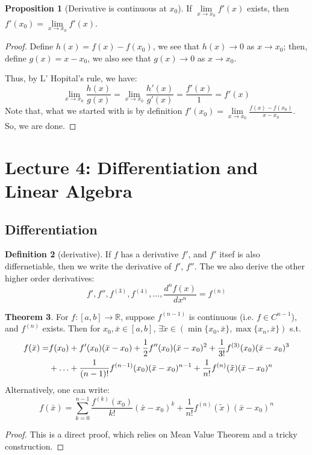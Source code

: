 \documentclass[12pt]{article}
\newcommand{\R}{{\mathbb R}}
\theoremstyle{definition}
\newtheorem{theorem}{Theorem}[section]
\newtheorem{definition}[theorem]{Definition}
\newtheorem{proposition}[theorem]{Proposition}
\theoremstyle{plain}
\begin{document}
\begin{proposition}
    [Derivative is continuous at $x_0$]
    If $\underset{x \to x_0} \lim f'(x)$ exists, then $f'(x_0) = \underset{x \to
    x_0} \lim
    f'(x)$.

    \begin{proof}
        Define $h(x) = f(x) - f(x_0)$, we see that $h(x) \to 0$ as $x \to x_0$;
        then, define $g(x) = x - x_0$, we also see that $g(x) \to 0$ as $x \to
        x_0$.

        Thus, by L' Hopital's rule, we have:
        \[
            \underset{x \to x_0} \lim \frac{h(x)}{g(x)} = \underset{x \to x_0}
            \lim
            \frac{h'(x)}{g'(x)} = \frac{f'(x)}{ 1} = f'(x)
        \]
        Note that, what we started with is by definition $f'(x_0) = \underset{x
        \to x_0} \lim \frac{f(x) - f(x_0)}{ x - x_0}$. So, we are done.
    \end{proof}
\end{proposition}

\section{Lecture 4: Differentiation and Linear Algebra}

\subsection{Differentiation}

\begin{definition}
    [derivative]
    If $f$ has a derivative $f'$, and $f'$ itsef is also differnetiable, then we
    write the derivative of $f'$, $f''$. The we also derive the other higher
    order derivatives:
    \[
        f', f'', f^{(3)}, f^{(4)}, \ldots, \frac{d ^n f(x)}{d x^n} = f^{(n)}
    \]
\end{definition}

\begin{theorem}
    For $f:[a,b] \to \R$, suppose $f^{(n-1)}$ is continuous (i.e. $f\in
    C^{n-1}$), and $f^{(n)}$ exists. Then for $x_0, \bar x \in [a,b]$, $\exists
    \tilde x \in \left( \min\{x_0, \bar x\}, \max \{ x_n, \bar x \} \right)$
    s.t.
    \[
        \aligned
        f(\bar x ) = & f(x_0) + f'(x_0) ( \bar  x- x_0) + \frac{1}{2} f''(x_0)
        (\bar x - x_0)^2 + \frac{1}{3!} f^{(3)} (x_0) (\bar x - x_0)^3 \\
        & + \ldots  + \frac{1}{(n-1)!} f^{(n-1)} (x_0) (\bar x - x_0) ^ {n-1} +
        \frac{1}{n!} f^{(n)}(\tilde x)(\bar x - x_0)^n
        \endaligned
    \]
    Alternatively, one can write:
    \[
        f(\bar x) = \sum_{k=0}^{n-1} \frac{f^{(k)}(x_0)}{k!}(\bar x - x_0)^k +
        \frac{1}{n!}f^{(n)}(\tilde x) (\bar x - x_0)^n
    \]
    \begin{proof}
        This is a direct proof, which relies on Mean Value Theorem and a tricky
        construction.
    \end{proof}
\end{theorem}
\end{document}
